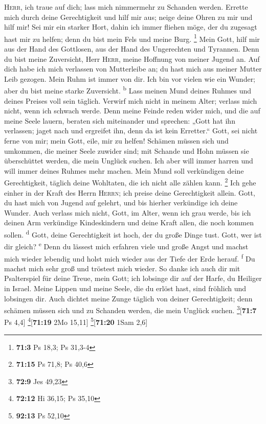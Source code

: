  \textsc{Herr}, ich traue auf dich; lass mich nimmermehr
zu Schanden werden.  Errette mich durch deine
Gerechtigkeit und hilf mir aus; neige deine Ohren zu mir und hilf mir!
 Sei mir ein starker Hort, dahin ich immer fliehen möge,
der du zugesagt hast mir zu helfen; denn du bist mein Fels und meine
Burg. \footnote{\textbf{71:3} Ps 18,3; Ps 31,3-4}  Mein
Gott, hilf mir aus der Hand des Gottlosen, aus der Hand des Ungerechten
und Tyrannen.  Denn du bist meine Zuversicht, Herr
\textsc{Herr}, meine Hoffnung von meiner Jugend an.  Auf
dich habe ich mich verlassen von Mutterleibe an; du hast mich aus meiner
Mutter Leib gezogen. Mein Ruhm ist immer von dir.  Ich bin
vor vielen wie ein Wunder; aber du bist meine starke Zuversicht.
\textsuperscript{b}  Lass meinen Mund deines Ruhmes und
deines Preises voll sein täglich.  Verwirf mich nicht in
meinem Alter; verlass mich nicht, wenn ich schwach werde.
 Denn meine Feinde reden wider mich, und die auf meine
Seele lauern, beraten sich miteinander  und sprechen:
„Gott hat ihn verlassen; jaget nach und ergreifet ihn, denn da ist kein
Erretter.``  Gott, sei nicht ferne von mir; mein Gott,
eile, mir zu helfen!  Schämen müssen sich und umkommen,
die meiner Seele zuwider sind; mit Schande und Hohn müssen sie
überschüttet werden, die mein Unglück suchen.  Ich aber
will immer harren und will immer deines Ruhmes mehr machen.
 Mein Mund soll verkündigen deine Gerechtigkeit, täglich
deine Wohltaten, die ich nicht alle zählen kann. \footnote{\textbf{71:15}
  Ps 71,8; Ps 40,6}  Ich gehe einher in der Kraft des
Herrn \textsc{Herrn}; ich preise deine Gerechtigkeit allein.
 Gott, du hast mich von Jugend auf gelehrt, und bis
hierher verkündige ich deine Wunder.  Auch verlass mich
nicht, Gott, im Alter, wenn ich grau werde, bis ich deinen Arm
verkündige Kindeskindern und deine Kraft allen, die noch kommen sollen.
\textsuperscript{d}  Gott, deine Gerechtigkeit ist hoch,
der du große Dinge tust. Gott, wer ist dir gleich? \textsuperscript{e}
 Denn du lässest mich erfahren viele und große Angst und
machst mich wieder lebendig und holst mich wieder aus der Tiefe der Erde
herauf. \textsuperscript{f}  Du machst mich sehr groß und
tröstest mich wieder.  So danke ich auch dir mit
Psalterspiel für deine Treue, mein Gott; ich lobsinge dir auf der Harfe,
du Heiliger in Israel.  Meine Lippen und meine Seele, die
du erlöst hast, sind fröhlich und lobsingen dir.  Auch
dichtet meine Zunge täglich von deiner Gerechtigkeit; denn schämen
müssen sich und zu Schanden werden, die mein Unglück suchen.
\footnote{\textbf{72:9} Jes 49,23}{[}\textbf{71:7} Ps 4,4{]}
\footnote{\textbf{72:12} Hi 36,15; Ps 35,10}{[}\textbf{71:19} 2Mo
15,11{]} \footnote{\textbf{92:13} Ps 52,10}{[}\textbf{71:20} 1Sam 2,6{]}

